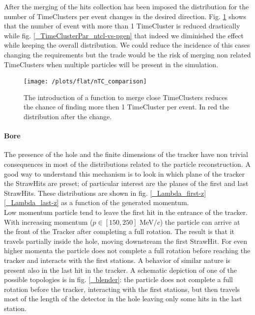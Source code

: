 \documentclass[12pt,a4paper,openright, oneside, titlepage]{book} %
\begin{document}
\noindent After the merging of the hits collection has been imposed the distribution for the number of TimeClusters per event changes in the desired direction. 
Fig. \ref{_nTC_comparison} shows that the number of event with more than 1 TimeCluster is reduced drastically while fig. \ref{_TimeClusterPar_ntcl-vs-pgen} that indeed we diminished the effect while keeping the overall distribution.
We could reduce the incidence of this cases changing the requirements but the trade would be the risk of merging non related TimeClusters when multiple particles will be present in the simulation.\\

\begin{figure}[h!]
\centering
\texttt{[image: /plots/flat/nTC\_comparison]}
\caption{The introduction of a function to merge close TimeClusters reduces the chance of finding more then 1 TimeCluster per event. In red the distribution after the change.}
\label{_nTC_comparison}
\end{figure}

\paragraph{Bore} The presence of the hole and the finite dimensions of the tracker have non trivial consequences in most of the distributions related to the particle reconstruction.
A good way to understand this mechanism is to look in which plane of the tracker the StrawHits are preset; of particular interest are the planes of the first and last StrawHits. 
These distributions are shown in fig. \ref{_Lambda_first-z} \ref{_Lambda_last-z} as a function of the generated momentum.\\
Low momentum particle tend to leave the first hit in the entrance of the tracker. 
With increasing momentum ($p \in [150,250]$ MeV$/c$) the particle can arrive at the front of the Tracker after completing  a full rotation. The result is that it travels partially inside the hole, moving downstream the first StrawHit.
For even higher momenta the particle does not complete a full rotation before reaching the tracker and interacts with the first stations.
A behavior of similar nature is present also in the last hit in the tracker. 
A schematic depiction of one of the possible topologies is in fig. \ref{_blender}: the particle does not complete a full rotation before the tracker, interacting with the first stations, but then travels most of the length of the detector in the hole leaving only some hits in the last station.
\end{document}
